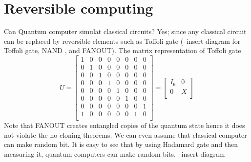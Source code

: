 \section{Reversible computing}
Can Quantum computer simulat classical circuits? Yes; since any classical circuit can be replaced by reversible elements such as Toffoli gate (--insert diagram for Toffoli gate, NAND , and FANOUT). The matrix representation of Toffoli gate 
\begin{equation*}
    U = \begin{bmatrix}
        1 & 0 & 0 & 0 & 0 & 0 &0 & 0\\
        0 & 1 & 0 & 0 & 0 & 0 &0 & 0\\
        0 & 0 & 1 & 0 & 0 & 0 &0 & 0\\
        0 & 0 & 0 & 1 & 0 & 0 &0 & 0\\
        0 & 0 & 0 & 0 & 1 & 0 &0 & 0\\
        0 & 0 & 0 & 0 & 0 & 1 &0 & 0\\
        0 & 0 & 0 & 0 & 0 & 0 &0 & 1\\
        1 & 0 & 0 & 0 & 0 & 0 &1 & 0\\
    \end{bmatrix}
    = \begin{bmatrix}
        I_6 & 0 \\
        0 & X\\
    \end{bmatrix}
\end{equation*}
Note that FANOUT creates entangled copies of the quantum state hence it does not violate the no cloning theorems.
We can even assume that classical computer can make random bit. It is easy to see that by using Hadamard gate and then measuring it, quantum computers can make random bits. --insert diagram

